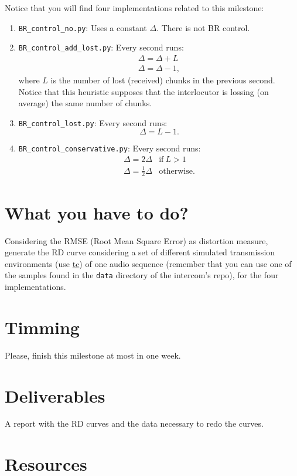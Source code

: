 Notice that you will find four implementations related to this milestone:
\begin{enumerate}
\item \verb|BR_control_no.py|: Uses a constant $\Delta$. There is not BR
  control.
\item \verb|BR_control_add_lost.py|: Every second runs:
  \begin{equation}
    \begin{array}{l}
      \Delta = \Delta + L \\
      \Delta = \Delta - 1,
    \end{array}
  \end{equation}
  where $L$ is the number of lost (received) chunks in the previous
  second. Notice that this heuristic supposes that the interlocutor is
  lossing (on average) the same number of chunks.
\item \verb|BR_control_lost.py|: Every second runs:
  \begin{equation}
    \Delta = L - 1.
  \end{equation}
\item \verb|BR_control_conservative.py|: Every second runs:
  \begin{equation}
    \begin{array}{ll}
      \Delta = 2\Delta & \text{if}~L>1 \\
      \Delta = \frac{1}{2}\Delta & \text{otherwise}.
    \end{array}
  \end{equation}
\end{enumerate}

\section{What you have to do?}

Considering the RMSE (Root Mean Square Error) as distortion measure,
generate the RD curve considering a set of different simulated
transmission environments (use
\href{https://man7.org/linux/man-pages/man8/tc.8.html}{tc}) of one
audio sequence (remember that you can use one of the samples found in
the \verb|data| directory of the intercom's repo), for the four
implementations.

\section{Timming}

Please, finish this milestone at most in one week.

\section{Deliverables}

A report with the RD curves and the data necessary to redo the curves.

\section{Resources}


